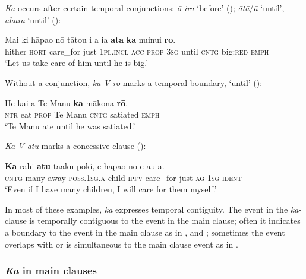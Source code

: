 \textit{Ka} occurs after certain temporal conjunctions: \textit{{\ꞌ}ō ira} ‘before’ (); \textit{{\ꞌ}ātā}/\textit{{\ꞌ}ā} ‘until’, \textit{{\ꞌ}ahara} ‘until’ (): 

\ea\label{ex:7.46}
\gll Mai ki hāpa{\ꞌ}o nō tātou i a ia \textbf{{\ꞌ}ātā} \textbf{ka} nuinui \textbf{rō}. \\
hither \textsc{hort} care\_for just \textsc{1pl.incl} \textsc{acc} \textsc{prop} \textsc{3sg} until \textsc{cntg} big:\textsc{red} \textsc{emph} \\

\glt
‘Let us take care of him until he is big.’ \textstyleExampleref{[R211.063]} 
\z

Without a conjunction, \textit{ka V rō} marks a temporal boundary, ‘until’ ():

\ea\label{ex:7.47}
\gll He kai a Te Manu \textbf{ka} mākona \textbf{rō}. \\
\textsc{ntr} eat \textsc{prop} Te Manu \textsc{cntg} satiated \textsc{emph} \\

\glt
‘Te Manu ate until he was satiated.’ \textstyleExampleref{[R245.067]} 
\z

\textit{Ka V atu} marks a concessive clause ():

\ea\label{ex:7.48}
\gll \textbf{Ka} rahi \textbf{atu} tā{\ꞌ}aku poki, e hāpa{\ꞌ}o nō e au {\ꞌ}ā. \\
\textsc{cntg} many away \textsc{poss.1sg.a} child \textsc{ipfv} care\_for just \textsc{ag} \textsc{1sg} \textsc{ident} \\

\glt
‘Even if I have many children, I will care for them myself.’ \textstyleExampleref{[R229.023]} 
\z

In most of these examples, \textit{ka} expresses temporal contiguity. The event in the \textit{ka-}clause is temporally contiguous to the event in the main clause; often it indicates a boundary to the event in the main clause as in ,  and ; sometimes the event overlaps with or is simultaneous to the main clause event as in . 

\subsubsection{\textit{Ka} in main clauses}\label{sec:7.2.6.3}

